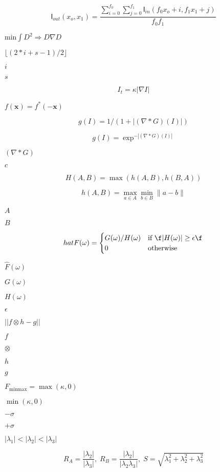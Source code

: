 \documentclass{article}
\begin{document}
\[ \mathsf{I}_{out}(x_o,x_1) = \frac{\sum_{i=0}^{f_0}\sum_{j=0}^{f_1}\mathsf{I}_{in}(f_0 x_o+i,f_1 x_1+j)}{f_0 f_1} \]
\pagebreak

$ \mbox{min} \int D^2 \Rightarrow D \nabla D $
\pagebreak

$ \lfloor (2*i+s-1)/2 \rfloor $
\pagebreak

$i$
\pagebreak

$s$
\pagebreak

\[ I_t = \kappa |\nabla I| \]
\pagebreak

$ f(\mathbf{x}) = f^*(-\mathbf{x}) $
\pagebreak

\[ g(I) = 1 / ( 1 + | (\nabla * G)(I)| ) \]
\pagebreak

\[ g(I) = \exp^{-|(\nabla * G)(I)|} \]
\pagebreak

$ (\nabla * G) $
\pagebreak

$ c $
\pagebreak

\[ H(A,B) = \max(h(A,B),h(B,A)) \]
\pagebreak

\[ h(A,B) = \max_{a \in A} \min_{b \in B} \| a - b\| \]
\pagebreak

$A$
\pagebreak

$B$
\pagebreak

\[ hat{F}(\omega) = \begin{cases} G(\omega) / H(\omega) & \text{if \f$|H(\omega)| \geq \epsilon\f$} \\ 0 & \text{otherwise} \end{cases} \]
\pagebreak

$\hat{F}(\omega)$
\pagebreak

$G(\omega)$
\pagebreak

$H(\omega)$
\pagebreak

$\epsilon$
\pagebreak

$||f \otimes h - g||$
\pagebreak

$f$
\pagebreak

$\otimes$
\pagebreak

$h$
\pagebreak

$g$
\pagebreak

$ F_{\mbox{minmax}} = \max(\kappa,0) $
\pagebreak

$ \min(\kappa,0) $
\pagebreak

$-\sigma$
\pagebreak

$+\sigma$
\pagebreak

$ | \lambda_1 | < | \lambda_2 | < |\lambda_3 | $
\pagebreak

\[ R_A = \frac{|\lambda_2|}{|\lambda_3|}, \; R_B = \frac{|\lambda_2|}{|\lambda_2\lambda_3|}, \; S = \sqrt{\lambda_1^2+\lambda_2^2+\lambda_3^2} \]
\pagebreak
\end{document}

